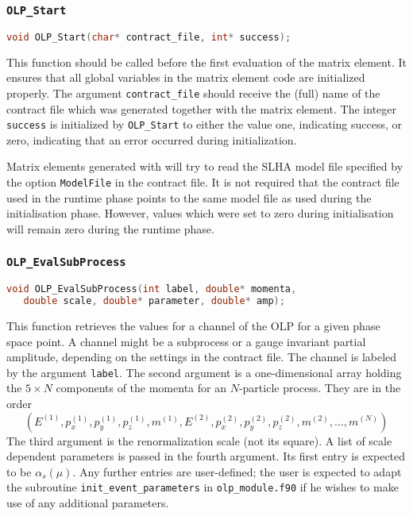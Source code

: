 \subsubsection*{\texttt{OLP\_Start}}
\begin{lstlisting}[language=C]
void OLP_Start(char* contract_file, int* success);
\end{lstlisting}
This function should be called before the first evaluation of the matrix
element. It ensures that all global variables in the matrix element code
are initialized properly. The argument \lstinline!contract_file!
should receive the (full) name of the contract file which was generated
together with the matrix element. The integer \lstinline!success! is
initialized by \lstinline!OLP_Start! to either the value one, indicating
success, or zero, indicating that an error occurred during initialization.

Matrix elements generated with \gosamv{} will try to read the SLHA model
file specified by the option \lstset{language=olp}\lstinline!ModelFile!
in the contract file. It is not required that the contract file used in
the runtime phase points to the same model file as used during the
initialisation phase. However, values which were set to zero during
initialisation will remain zero during the runtime phase.

\subsubsection*{\texttt{OLP\_EvalSubProcess}}
\lstset{language=C}
\begin{lstlisting}[language=C]
void OLP_EvalSubProcess(int label, double* momenta,
   double scale, double* parameter, double* amp);
\end{lstlisting}
This function retrieves the values for a channel of the OLP for a given
phase space point. A channel might be a subprocess or a
gauge invariant partial amplitude, depending on the settings in the
contract file. The channel is labeled by the argument \lstinline!label!.
The second argument is a one-dimensional array holding the $5\times N$
components of the momenta for an $N$-particle process. They are in the order
\begin{displaymath}
(E^{(1)}, p_x^{(1)}, p_y^{(1)}, p_z^{(1)}, m^{(1)},
 E^{(2)}, p_x^{(2)}, p_y^{(2)}, p_z^{(2)}, m^{(2)},
 \ldots, m^{(N)})
\end{displaymath}
The third argument is the renormalization scale (not its square).
A list of scale dependent parameters is passed in the fourth argument.
Its first entry is expected to be $\alpha_s(\mu)$. Any further entries
are user-defined; the user is expected to adapt the subroutine
\texttt{init\_event\_parameters} in \texttt{olp\_module.f90}
if he wishes to make use of any additional parameters.

